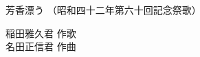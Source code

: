 \documentclass[10pt,b5j]{tarticle} %
\begin{document}
\begin{minipage}[c]{0.7\hsize} %
    \begin{center}
        {\LARGE
            芳香漂う %
        }
        {\small 
            （昭和四十二年第六十回記念祭歌） %
        }
    \end{center}
\end{minipage}
\begin{minipage}[c]{0.3\hsize} %
    \begin{flushright} %
        稲田雅久君 作歌\\名田正信君 作曲 %
    \end{flushright}
\end{minipage}
\end{document}
